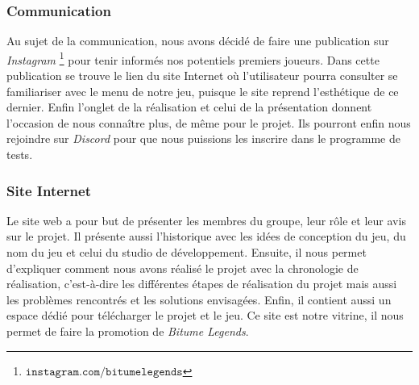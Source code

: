 \documentclass[a4paper,12pt]{article}
\newcommand{\btmlgs}{\textsl{Bitume Legends}}
\begin{document}
            \subsubsection{Communication}
                Au sujet de la communication, nous avons décidé de faire une publication sur \textsl{Instagram}
                \footnote{\(\mathtt{instagram.com/bitumelegends}\)}
                pour tenir informés nos potentiels premiers joueurs. Dans cette publication se trouve le lien 
                du site Internet où l'utilisateur pourra consulter se familiariser avec le menu de notre
                jeu, puisque le site reprend l'esthétique de ce dernier. Enfin l'onglet de la réalisation
                et celui de la présentation donnent l'occasion de nous connaître plus, de même pour le projet.
                Ils pourront enfin nous rejoindre sur \textsl{Discord} pour que nous puissions les inscrire dans le
                programme de tests.
        
            \subsubsection{Site Internet}
                Le site web a pour but de présenter les membres du groupe, leur rôle et leur avis sur le projet.
                Il présente aussi l'historique avec les idées de conception du jeu, du nom du jeu et celui du studio
                de développement. Ensuite, il nous permet d'expliquer comment nous avons réalisé le projet avec la
                chronologie de réalisation, c'est-à-dire les différentes étapes de réalisation du projet mais aussi
                les problèmes rencontrés et les solutions envisagées. Enfin, il contient aussi
                un espace dédié pour télécharger le projet et le jeu. Ce site est notre vitrine, il nous permet de faire
                la promotion de \btmlgs.
        
\end{document}
